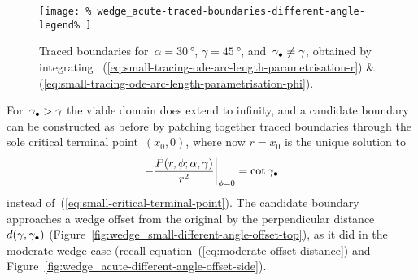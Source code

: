 \begin{figure}
  \newcommand*{\subfigurewidth}{0.4\textwidth}
  \centering
  \texttt{[image: \%
    wedge\_acute-traced-boundaries-different-angle-legend\%
  ]}
  \hspace*{\fill}
  \begin{subfigure}[t]{\subfigurewidth}
  \end{subfigure}
    \hfill
  \begin{subfigure}[t]{\subfigurewidth}
  \end{subfigure}
  \hspace*{\fill}
  \caption{
    Traced boundaries for~$\alpha = \SI{30}{\degree}$,
    $\gamma = \SI{45}{\degree}$, and~$\gamma_\bullet \ne \gamma$,
    obtained by integrating~%
      (\ref{eq:small-tracing-ode-arc-length-parametrisation-r})
    \&~%
      (\ref{eq:small-tracing-ode-arc-length-parametrisation-phi}).
  }
  \label{fig:wedge_small-traced-boundaries-different-angle}
\end{figure}

For~$\gamma_\bullet > \gamma$ the viable domain does extend to infinity,
and a candidate boundary can be constructed as before
by patching together traced boundaries through
the sole critical terminal point~$(x_0, 0)$,
where now $r = x_0$ is the unique solution to
\begin{equation}
  \eval*{
    -\frac{\desing{P}(r, \phi; \alpha, \gamma)}{r^2}
  }_{\phi=0}
    = \cot\gamma_\tr
  \label{eq:small-critical-terminal-point-different-angle}
\end{equation}
instead of~(\ref{eq:small-critical-terminal-point}).
The candidate boundary approaches a wedge offset from the original
by the perpendicular distance~$d (\gamma, \gamma_\bullet)$
(Figure~\ref{fig:wedge_small-different-angle-offset-top}),
as it did in the moderate wedge case
(recall equation~(\ref{eq:moderate-offset-distance})
and Figure~\ref{fig:wedge_acute-different-angle-offset-side}).

\begin{figure}
\end{figure}

